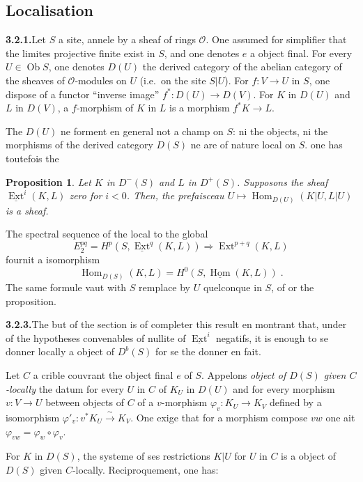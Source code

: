\documentclass[12pt,a4paper]{article}
\theoremstyle{plain}
\newtheorem{proposition}[theorem]{Proposition}
\theoremstyle{definition}
\DeclareMathOperator{\Hom}{Hom}
\DeclareMathOperator{\Ext}{Ext}
\DeclareMathOperator{\Ob}{Ob}
\begin{document}
\subsection{Localisation}

\noindent\textbf{3.2.1.}\quad Let $S$ a site, annele by a sheaf of rings $\mathcal{O}$. One assumed for simplifier that the limites projective finite exist in $S$, and one denotes $e$ a object final. For every $U \in \Ob S$, one denotes $D(U)$ the derived category of the abelian category of the sheaves of $\mathcal{O}$-modules on $U$ (i.e.\ on the site $S|U$). For $f : V \to U$ in $S$, one dispose of a functor ``inverse image'' $f^* : D(U) \to D(V)$. For $K$ in $D(U)$ and $L$ in $D(V)$, a $f$-morphism of $K$ in $L$ is a morphism $f^* K \to L$.

The $D(U)$ ne forment en general not a champ on $S$: ni the objects, ni the morphisms of the derived category $D(S)$ ne are of nature local on $S$. one has toutefois the

\begin{proposition}\label{prop:3.2.2}
Let $K$ in $D^-(S)$ and $L$ in $D^+(S)$. Supposons the sheaf $\underline{\Ext}^i(K, L)$ zero for $i < 0$. Then, the prefaisceau $U \mapsto \Hom_{D(U)}(K|U, L|U)$ is a sheaf.
\end{proposition}

The spectral sequence of the local to the global
\[
E_2^{pq} = H^p(S, \underline{\Ext}^q(K, L)) \Rightarrow \Ext^{p+q}(K, L)
\]
fournit a isomorphism
\[
\Hom_{D(S)}(K, L) = H^0(S, \underline{\Hom}(K, L))\;.
\]
The same formule vaut with $S$ remplace by $U$ quelconque in $S$, of or the proposition.

\smallskip
\noindent\textbf{3.2.3.}\quad The but of the section is of completer this result en montrant that, under of the hypotheses convenables of nullite of $\underline{\Ext}^i$ negatifs, it is enough to se donner locally a object of $D^b(S)$ for se the donner en fait.

Let $C$ a crible couvrant the object final $e$ of $S$. Appelons \emph{object of $D(S)$ given $C$-locally} the datum for every $U$ in $C$ of $K_U$ in $D(U)$ and for every morphism $v : V \to U$ between objects of $C$ of a $v$-morphism $\varphi_v : K_U \to K_V$ defined by a isomorphism $\varphi'_v : v^* K_U \xrightarrow{\;\sim\;} K_V$. One exige that for a morphism compose $vw$ one ait $\varphi_{vw} = \varphi_w \circ \varphi_v$.

For $K$ in $D(S)$, the systeme of ses restrictions $K|U$ for $U$ in $C$ is a object of $D(S)$ given $C$-locally. Reciproquement, one has:
\end{document}
